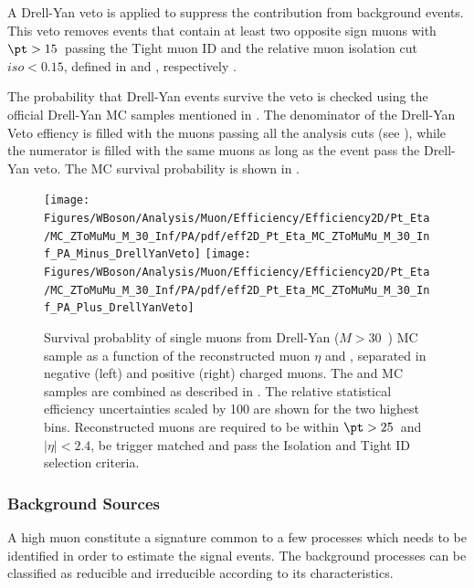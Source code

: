 A Drell-Yan veto is applied to suppress the contribution from \DYToMuMu background events. This veto removes events that contain at least two opposite sign muons with $\pt > 15$~\GeVc passing the Tight muon ID and the relative muon isolation cut $iso < 0.15$, defined in  and , respectively .

The probability that Drell-Yan events survive the veto is checked using the official Drell-Yan MC samples mentioned in . The denominator of the Drell-Yan Veto effiency is  filled with the muons passing all the \W analysis cuts (see ), while the numerator is filled with the same muons as long as the event pass the Drell-Yan veto. The MC survival probability is shown in .

\begin{figure}[htb]
 \begin{center}
   \texttt{[image: Figures/WBoson/Analysis/Muon/Efficiency/Efficiency2D/Pt\_Eta/MC\_ZToMuMu\_M\_30\_Inf/PA/pdf/eff2D\_Pt\_Eta\_MC\_ZToMuMu\_M\_30\_Inf\_PA\_Minus\_DrellYanVeto]}
   \texttt{[image: Figures/WBoson/Analysis/Muon/Efficiency/Efficiency2D/Pt\_Eta/MC\_ZToMuMu\_M\_30\_Inf/PA/pdf/eff2D\_Pt\_Eta\_MC\_ZToMuMu\_M\_30\_Inf\_PA\_Plus\_DrellYanVeto]}
   \caption{Survival probablity of single muons from Drell-Yan ($M > 30$~\GeVcc) MC sample  as a function of the reconstructed muon $\eta$ and \pt, separated in negative (left) and positive (right) charged muons. The \pPb and \Pbp MC samples are combined as described in . The relative statistical efficiency uncertainties scaled by 100 are shown for the two highest \pt bins. Reconstructed muons are required to be within $\pt > 25$~\GeVc and $|\eta| < 2.4$, be trigger matched and pass the Isolation and Tight ID selection criteria.}
   \label{fig:DrellYanVetoZEfficiency2D}
 \end{center}
\end{figure}


\subsubsection{Background Sources} \label{sec:WBoson_Analysis_BackgroundSources}

A high \pt muon constitute a signature common to a few processes which needs to be identified in order to estimate the \W signal events. The background processes can be classified as reducible and irreducible according to its characteristics.

